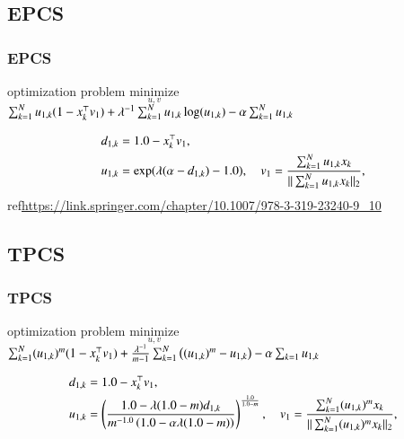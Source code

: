 \documentclass[fleqn,dvipdfmx,10pt]{beamer}
\begin{document}
\subsection{EPCS}
\begin{frame}\frametitle{EPCS}%
  \begin{block}{optimization problem}
    $\underset{u,v}{\text{minimize}}$
    $\sum_{k=1}^Nu_{1,k}(1-x_k^{\top}v_1)+\lambda^{-1}\sum_{k=1}^Nu_{1,k}\log(u_{1,k})-\alpha\sum_{k=1}^Nu_{1,k}$\centering\\
  \end{block}
  \begin{align*}
    d_{1,k}&=1.0-x_k^{\top}v_1,\\
    u_{1,k}&=\exp(\lambda(\alpha-d_{1,k})-1.0),\quad
    v_{1}=\frac{\sum_{k=1}^N u_{1,k} x_{k}}{||\sum_{k=1}^N u_{1,k}x_{k}||_2},\\
  \end{align*}
  ref\url{https://link.springer.com/chapter/10.1007/978-3-319-23240-9_10}
\end{frame}

\subsection{TPCS}
\begin{frame}\frametitle{TPCS}%
  \begin{block}{optimization problem}
    $\underset{u,v}{\text{minimize}}$
    $\sum_{k=1}^N(u_{1,k})^m(1-x_k^{\top}v_1)+\frac{\lambda^{-1}}{m-1}\sum_{k=1}^N\left((u_{1,k})^m-u_{1,k}\right)-\alpha\sum_{k=1}u_{1,k}$\centering\\
  \end{block}
  \begin{align*}
    d_{1,k}&=1.0-x_k^{\top}v_1,\\
   u_{1,k}&=\left(\frac{1.0-\lambda(1.0-m)d_{1,k}}{m^{-1.0}\left(1.0-\alpha\lambda(1.0-m)\right)}\right)^{\frac{1.0}{1.0-m}},\quad
   v_{1}=\frac{\sum_{k=1}^N (u_{1,k})^m x_{k}}{||\sum_{k=1}^N (u_{1,k})^mx_{k}||_2},\\
  \end{align*}
\end{frame}
\end{document}
